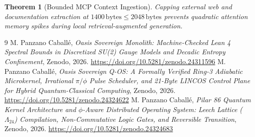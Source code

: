 \documentclass[11pt,a4paper]{article}
\newtheorem{theorem}{Theorem}
\begin{document}
\begin{theorem}[Bounded MCP Context Ingestion]
Capping external web and documentation extraction at $1400\,\mathrm{bytes} \le 2048\,\mathrm{bytes}$ prevents quadratic attention memory spikes during local retrieval-augmented generation.
\end{theorem}

\begin{thebibliography}{9}
 M. Panzano Caball\'e, \emph{Oasis Sovereign Monolith: Machine-Checked Lean 4 Spectral Bounds in Discretized SU(2) Gauge Models and Decadic Entropy Confinement}, Zenodo, 2026. \url{https://doi.org/10.5281/zenodo.24311596}
 M. Panzano Caball\'e, \emph{Oasis Sovereign Q-OS: A Formally Verified Ring-3 Adiabatic Microkernel, Irrational $\pi/\phi$ Pulse Scheduler, and 21-Byte LINCOS Control Plane for Hybrid Quantum-Classical Computing}, Zenodo, 2026. \url{https://doi.org/10.5281/zenodo.24324622}
 M. Panzano Caball\'e, \emph{Pilar 86 Quantum Kernel Architecture and $\phi$-Aware Distributed Operating System: Leech Lattice ($\Lambda_{24}$) Compilation, Non-Commutative Logic Gates, and Reversible Transition}, Zenodo, 2026. \url{https://doi.org/10.5281/zenodo.24324683}
\end{thebibliography}
\end{document}
